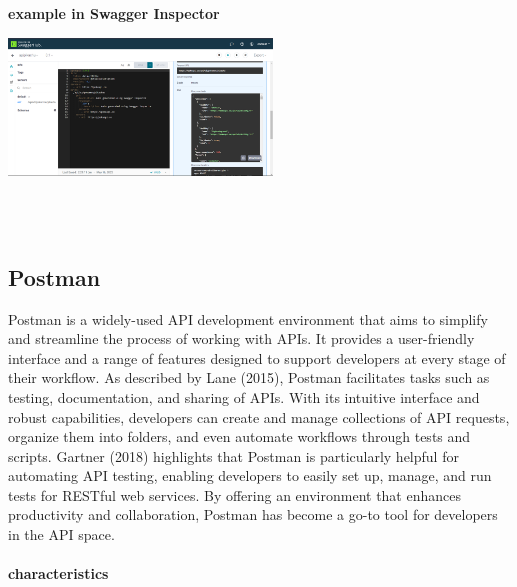 \documentclass[twoside,twocolumn]{article}
\begin{document}
 \textbf{example in Swagger Inspector  }
 \begin{center}
	\includegraphics[width=7cm]{./Imagenes/ejemplo2} 
\end{center}
\\ \\


\subsection{Postman}
Postman is a widely-used API development environment that aims to simplify and streamline the process of working with APIs. It provides a user-friendly interface and a range of features designed to support developers at every stage of their workflow. As described by Lane (2015), Postman facilitates tasks such as testing, documentation, and sharing of APIs. With its intuitive interface and robust capabilities, developers can create and manage collections of API requests, organize them into folders, and even automate workflows through tests and scripts. Gartner (2018) highlights that Postman is particularly helpful for automating API testing, enabling developers to easily set up, manage, and run tests for RESTful web services. By offering an environment that enhances productivity and collaboration, Postman has become a go-to tool for developers in the API space.\\\\
 \textbf{characteristics}
\end{document}
